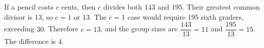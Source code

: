 If a pencil costs $c$ cents, then $c$ divides both $143$ and $195$. Their greatest common divisor is $13$, so $c=1$ or $13$. The $c=1$ case would require $195$ sixth graders, exceeding $30$. Therefore $c=13$, and the group sizes are $\dfrac{143}{13} = 11$ and $\dfrac{195}{13} = 15$. The difference is $\boxed4$.

